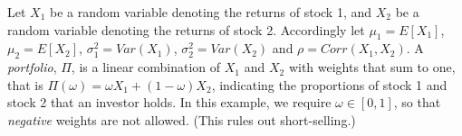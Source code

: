 \documentclass[addpoints,12pt]{exam}
\begin{document}
\begin{questions}
%


\question Let $X_1$ be a random variable denoting the returns of stock 1, and $X_2$ be a random variable denoting the returns of stock 2. Accordingly let $\mu_1 = E[X_1]$, $\mu_2 = E[X_2]$, $\sigma_1^2 = Var(X_1)$, $\sigma_2^2 = Var(X_2)$ and $\rho = Corr(X_1, X_2)$. A \emph{portfolio}, $\Pi$,  is a linear combination of $X_1$ and $X_2$ with weights that sum to one, that is $\Pi(\omega) = \omega X_1 + (1-\omega)X_2$, indicating the proportions of stock 1 and stock 2 that an investor holds. In this example, we require $\omega \in [0,1]$, so that \emph{negative} weights are not allowed. (This rules out short-selling.) 
	\begin{parts}

\end{parts}
\end{questions}
\end{document}
